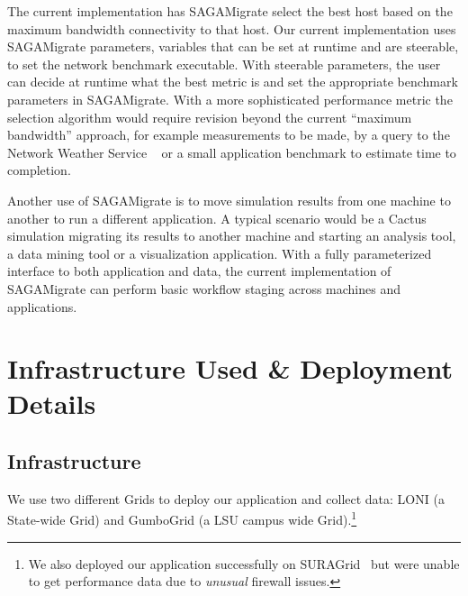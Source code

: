 \documentclass[conference,final]{IEEEtran}
\newcommand{\fixme}[1]{ { \bf{ ***FIXME: #1 }} }
\begin{document}
The current implementation has SAGAMigrate select the best host based
on the maximum bandwidth connectivity to that host. Our current
implementation uses SAGAMigrate parameters, variables that can be set
at runtime and are steerable, to set the network benchmark executable.
With steerable parameters, the user can decide at runtime what the
best metric is and set the appropriate benchmark parameters in
SAGAMigrate. With a more sophisticated performance metric the
selection algorithm would require revision beyond the current
``maximum bandwidth'' approach, for example measurements to be made,
by a query to the Network Weather Service ~\cite{NWS_web, bqp_url} or
a small application benchmark to estimate time to completion.

Another use of SAGAMigrate is to move simulation results from one
machine to another to run a different application. A typical scenario
would be a Cactus simulation migrating its results to another machine
and starting an analysis tool, a data mining tool or a visualization
application. With a fully parameterized interface to both application
and data, the current implementation of SAGAMigrate can perform basic
workflow staging across machines and applications.



\section{Infrastructure Used \& Deployment Details}


\subsection{Infrastructure}

We use two different Grids to deploy our application and collect data:
LONI (a State-wide Grid) and GumboGrid (a LSU campus wide
Grid).\footnote{We also deployed our application successfully on
  SURAGrid~\cite{suragrid_web} but were unable to get performance data
  due to {\it unusual} firewall issues.}

\end{document}
